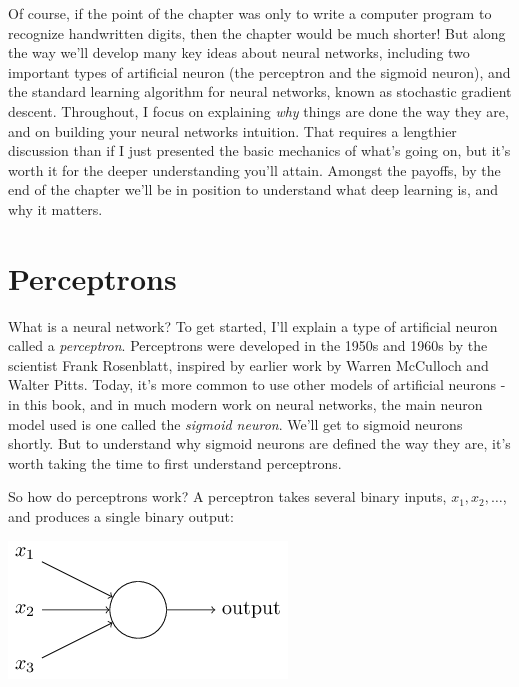 \documentclass[a4paper,twoside,10pt]{book}
\begin{document}
Of course, if the point of the chapter was only to write a computer program to recognize handwritten digits, then the chapter would be much shorter! But along the way we'll develop many key ideas about neural networks, including two important types of artificial neuron (the perceptron and the sigmoid neuron), and the standard learning algorithm for neural networks, known as stochastic gradient descent. Throughout, I focus on explaining \textit{why} things are done the way they are, and on building your neural networks intuition. That requires a lengthier discussion than if I just presented the basic mechanics of what's going on, but it's worth it for the deeper understanding you'll attain. Amongst the payoffs, by the end of the chapter we'll be in position to understand what deep learning is, and why it matters.

\section{Perceptrons}
What is a neural network? To get started, I'll explain a type of artificial neuron called a \textit{perceptron}. Perceptrons were developed in the 1950s and 1960s by the scientist Frank Rosenblatt, inspired by earlier work by Warren McCulloch and Walter Pitts. Today, it's more common to use other models of artificial neurons - in this book, and in much modern work on neural networks, the main neuron model used is one called the \textit{sigmoid neuron}. We'll get to sigmoid neurons shortly. But to understand why sigmoid neurons are defined the way they are, it's worth taking the time to first understand perceptrons.

So how do perceptrons work? A perceptron takes several binary inputs, $x_1, x_2, \ldots$,  and produces a single binary output:
\begin{center}
	\includegraphics[scale=0.5]{./figures/ch1/tikz0}
\end{center}
\end{document}
